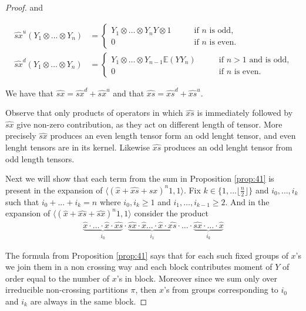 \documentclass{amsart}
\begin{document}
\begin{proof}
and


\begin{align*}
			\widehat{sx}^u\left(Y_1\otimes\ldots\otimes Y_n\right)&=\begin{cases}
		Y_1\otimes\ldots\otimes Y_n Y\otimes 1\qquad &\mbox{if $n$ is odd,}\\
		0 \qquad &\mbox{if $n$ is even.}
	\end{cases}\\
			\widehat{sx}^d\left(Y_1\otimes\ldots\otimes Y_n\right)&=\begin{cases}
		Y_1\otimes\ldots\otimes Y_{n-1}\mathbb{E}(YY_n)\qquad &\mbox{if $n>1$ and is odd,}\\
		0 \qquad &\mbox{if $n$ is even.}
	\end{cases}
\end{align*}

We have that $\widehat{sx}=\widehat{sx}^d+\widehat{sx}^u$ and that $\widehat{xs}=\widehat{xs}^d+\widehat{xs}^u$.

Observe that only products of operators in which $\widehat{xs}$ is immediately followed by $\widehat{sx}$ give non-zero contribution, as they act on different length of tensor. More precisely $\widehat{sx}$ produces an even length tensor form an odd lenght tensor, and even lenght tensors are in its kernel. Likewise $\widehat{xs}$ produces an odd lenght tensor from odd length tensors.

Next we will show that each term from the sum in Proposition \ref{prop:41} is present in the expansion of $\langle (\widehat{x}+\widehat{xs}+\widehat{sx})^n 1,1\rangle$.
 Fix $k\in\{1,\ldots\lfloor \tfrac{n}{2}\rfloor\}$ and $i_0,\ldots,i_k$ such that $i_0+\ldots+i_k=n$ where $i_0,i_k\geq 1$ and $i_1,\ldots,i_{k-1}\geq 2$. 
 And in the expansion of 
 $\langle (\widehat{x}+\widehat{xs}+\widehat{sx})^n 1,1\rangle$ 
 consider the product
\begin{align*}
	\underbrace{\widehat{x}\cdot\ldots\cdot\widehat{x} \cdot \widehat{xs}}_{i_0} \cdot \underbrace{\widehat{sx}\cdot \widehat{x}\ldots\cdot \widehat{x} \cdot \widehat{xs}}_{i_1}\cdot\ldots\cdot \underbrace{\widehat{sx}\cdot\ldots\cdot \widehat{x} }_{i_k}
\end{align*}

The formula from Proposition \ref{prop:41} says that for each such fixed groups of $x$'s we join them in a non crossing way and each block contributes moment of $Y$ of order equal to the number of $x$'s in block. Moreover since we sum only over irreducible non-crossing partitions $\pi$, then $x$'s from groups corresponding to $i_0$ and $i_k$ are always in the same block.


\end{proof}
\end{document}

